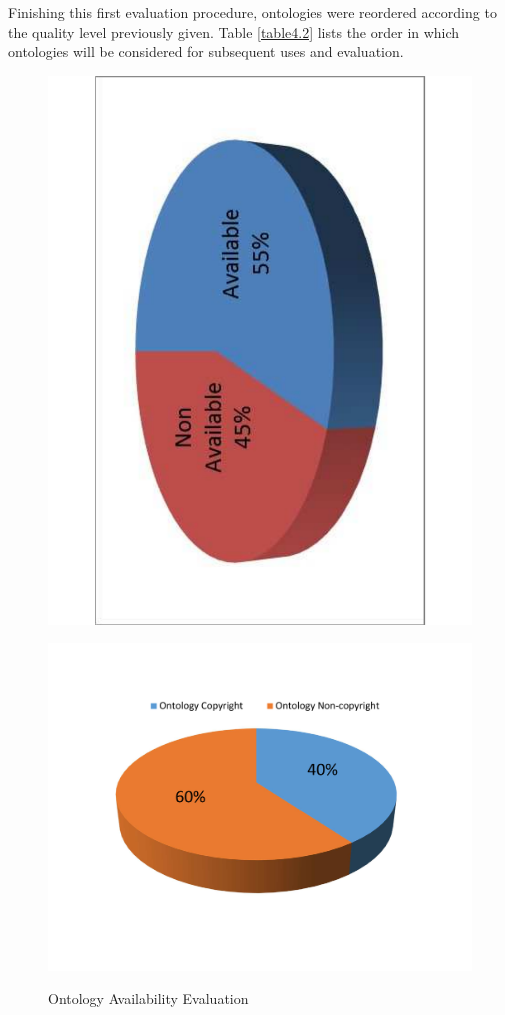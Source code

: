 Finishing this first evaluation procedure, ontologies were reordered according to the quality level previously given. Table \ref{table4.2} lists the order in which ontologies will be considered for subsequent uses and evaluation. 


\begin{figure}
	\centering
	\scriptsize
	\begin{minipage}{.5\textwidth}
		\includegraphics[scale=0.3, angle=-90]{figure-chapterIV/fig4-3.pdf}\\
		\caption{Ontology Availability Evaluation}
		\label{figure4-3}
	\end{minipage}%
	\begin{minipage}{.5\textwidth}
		\includegraphics[scale=0.35]{figure-chapterIV/fig4-4}\\

\end{minipage}
\end{figure}
